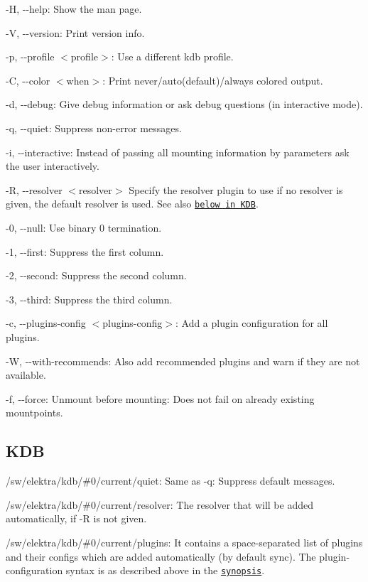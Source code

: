 \begin{DoxyItemize}
\item {\ttfamily -\/H}, {\ttfamily -\/-\/help}\+: Show the man page.
\item {\ttfamily -\/V}, {\ttfamily -\/-\/version}\+: Print version info.
\item {\ttfamily -\/p}, {\ttfamily -\/-\/profile $<$profile$>$}\+: Use a different kdb profile.
\item {\ttfamily -\/C}, {\ttfamily -\/-\/color $<$when$>$}\+: Print never/auto(default)/always colored output.
\item {\ttfamily -\/d}, {\ttfamily -\/-\/debug}\+: Give debug information or ask debug questions (in interactive mode).
\item {\ttfamily -\/q}, {\ttfamily -\/-\/quiet}\+: Suppress non-\/error messages.
\item {\ttfamily -\/i}, {\ttfamily -\/-\/interactive}\+: Instead of passing all mounting information by parameters ask the user interactively.
\item {\ttfamily -\/R}, {\ttfamily -\/-\/resolver $<$resolver$>$} Specify the resolver plugin to use if no resolver is given, the default resolver is used. See also \href{#KDB}{\tt below in K\+DB}.
\item {\ttfamily -\/0}, {\ttfamily -\/-\/null}\+: Use binary 0 termination.
\item {\ttfamily -\/1}, {\ttfamily -\/-\/first}\+: Suppress the first column.
\item {\ttfamily -\/2}, {\ttfamily -\/-\/second}\+: Suppress the second column.
\item {\ttfamily -\/3}, {\ttfamily -\/-\/third}\+: Suppress the third column.
\item {\ttfamily -\/c}, {\ttfamily -\/-\/plugins-\/config $<$plugins-\/config$>$}\+: Add a plugin configuration for all plugins.
\item {\ttfamily -\/W}, {\ttfamily -\/-\/with-\/recommends}\+: Also add recommended plugins and warn if they are not available.
\item {\ttfamily -\/f}, {\ttfamily -\/-\/force}\+: Unmount before mounting\+: Does not fail on already existing mountpoints.
\end{DoxyItemize}

\subsection*{K\+DB}


\begin{DoxyItemize}
\item {\ttfamily /sw/elektra/kdb/\#0/current/quiet}\+: Same as {\ttfamily -\/q}\+: Suppress default messages.
\item {\ttfamily /sw/elektra/kdb/\#0/current/resolver}\+: The resolver that will be added automatically, if {\ttfamily -\/R} is not given.
\item {\ttfamily /sw/elektra/kdb/\#0/current/plugins}\+: It contains a space-\/separated list of plugins and their configs which are added automatically (by default sync). The plugin-\/configuration syntax is as described above in the \href{#SYNOPSIS}{\tt synopsis}.
\end{DoxyItemize}

